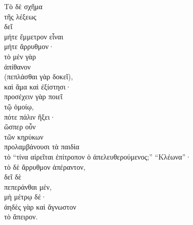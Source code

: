 {\large
\begin{greek}
\noindent Τὸ δὲ σχῆμα \\
\tabto{2em} τῆς λέξεως \\
\tabto{4em} δεῖ \\
\tabto{6em} μήτε ἔμμετρον εἶναι \\
\tabto{6em} μήτε ἄρρυθμον· \\
\tabto{8em} τὸ μὲν γὰρ \\
\tabto{10em} ἀπίθανον \\
\tabto{8em} (πεπλάσθαι γὰρ δοκεῖ), \\
\tabto{8em} καὶ ἅμα καὶ ἐξίστησι· \\
\tabto{8em} προσέχειν γὰρ ποιεῖ \\
\tabto{10em} τῷ ὁμοίῳ, \\
\tabto{10em} πότε πάλιν ἥξει· \\
\tabto{8em} ὥσπερ οὖν \\
\tabto{10em} τῶν κηρύκων \\
\tabto{12em} προλαμβάνουσι τὰ παιδία \\
\tabto{12em} τὸ ``τίνα αἱρεῖται ἐπίτροπον ὁ ἀπελευθερούμενος;'' ``Κλέωνα''·\\
\tabto{8em} τὸ δὲ ἄρρυθμον ἀπέραντον, \\
\tabto{10em} δεῖ δὲ \\
\tabto{12em} πεπεράνθαι μέν, \\
\tabto{12em} μὴ μέτρῳ δέ·\\
\tabto{12em} ἀηδὲς γὰρ καὶ ἄγνωστον \\
\tabto{14em} τὸ ἄπειρον.\\

\end{greek}
}

